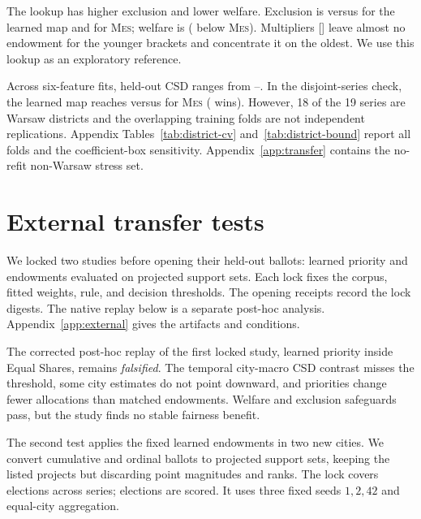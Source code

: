 \documentclass{article}
\newcommand{\MES}{\textsc{Mes}}
\begin{document}
The lookup has higher exclusion and lower welfare. Exclusion is \AgeLookupExcl{} versus
\EndowExcl{} for the learned map and \TestMESExcl{} for \MES{}; welfare is
\AgeLookupWelfare{} (\AgeLookupWelfareCostPct{} below \MES{}). Multipliers
[\AgeLookupMultipliers] leave almost no endowment for the younger brackets
and concentrate it on the oldest. We use this lookup as an exploratory reference.

Across \EndowNumSeeds{} six-feature fits, held-out CSD ranges from
\EndowSeedLo--\EndowSeedHi{}. In the disjoint-series check, the learned map reaches
\DistrictCVLearnedCSD{} versus \DistrictCVMESCSD{} for \MES{}
(\DistrictCVWins{} wins). However, 18 of the 19 series are Warsaw districts and
the overlapping training folds are not independent replications. Appendix
Tables~\ref{tab:district-cv} and~\ref{tab:district-bound} report all folds and
the coefficient-box sensitivity. Appendix~\ref{app:transfer} contains the
no-refit non-Warsaw stress set.

\section{External transfer tests}
\label{sec:sequential-transfer}

We locked two studies before opening their held-out ballots: learned priority
and endowments evaluated on projected support sets. Each lock fixes the corpus,
fitted weights, rule, and decision thresholds. The opening receipts record the
lock digests. The native replay below is a separate post-hoc analysis.
Appendix~\ref{app:external} gives the artifacts and conditions.

The corrected post-hoc replay of the first locked study, learned priority
inside Equal Shares, remains \emph{falsified}. The temporal city-macro CSD
contrast misses the threshold, some city estimates do not point downward, and
priorities change fewer allocations than matched endowments. Welfare and
exclusion safeguards pass, but the study finds no stable fairness benefit.

The second test applies the fixed learned endowments in two new cities. We
convert cumulative and ordinal ballots to projected support sets, keeping the
listed projects but discarding point magnitudes and ranks. The lock covers
\ExternalElectionN{} elections across \ExternalSeriesN{} series;
\ExternalScoreN{} elections are scored. It uses three fixed seeds $1,2,42$ and equal-city aggregation.
\end{document}

